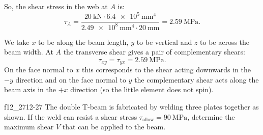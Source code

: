 \begin{derivation}
  So, the shear stress in the web at $A$ is:
  \begin{equation*}
    \tau_A = \frac{\qty{20}{\kN} \cdot \qty{6,4e5}{\mm^{4}} }{\qty{2,49e8}{\mm^{4}} \cdot \qty{20}{\mm} } = \qty{2,59}{\MPa} 
  .\end{equation*}

  We take $x$ to be along the beam length, $y$ to be vertical and $z$ to be across the beam width.
  At $A$ the transverse shear gives a pair of complementary shears:
  \begin{equation*}
    \tau_{xy} = \tau_{yx} = \qty{2,59}{\MPa} 
  .\end{equation*}
  On the face normal to $x$ this corresponds to the shear acting downwards in the $-y$ direction and on the face normal to $y$ the complementary shear acts along the beam axis in the $+x$ direction (so the little element does not spin).
\end{derivation}


\begin{problemwithimage}{f12_27}{12-27}
  The double T-beam is fabricated by welding three plates together as shown.
  If the weld can resist a shear stress $\tau_{\mathrm{allow}} = \qty{90}{\MPa}$, determine the maximum shear $V$ that can be applied to the beam.
\end{problemwithimage}

